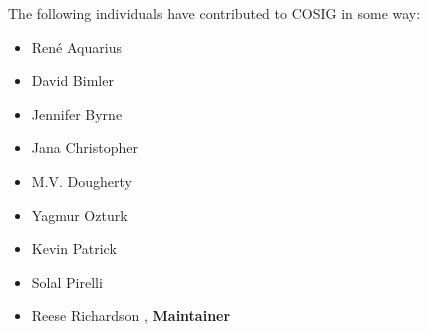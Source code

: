 \documentclass[letterpaper, 12pt]{article}
\begin{document}
\pagebreak

The following individuals have contributed to COSIG in some way:

\begin{itemize}
    \setlength\itemsep{-0.5em}
    \item Ren\'e Aquarius 
    \item David Bimler 
    \item Jennifer Byrne 
    \item Jana Christopher 
    \item M.V. Dougherty 
    \item Yagmur Ozturk 
    \item Kevin Patrick 
    \item Solal Pirelli 
    \item Reese Richardson , \textbf{Maintainer}
\end{itemize}
\end{document}
